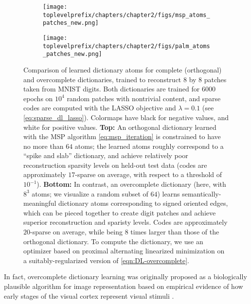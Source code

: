 \documentclass[\toplevelprefix/book-main.tex]{subfiles}
\begin{document}
\begin{figure}[t]
\centering
    \begin{subfigure}{0.9\linewidth}
        \centering
        \texttt{[image: \\toplevelprefix/chapters/chapter2/figs/msp\_atoms\_patches\_new.png]}
        \caption{}
    \end{subfigure}
    \begin{subfigure}{0.9\linewidth}
        \centering
        \texttt{[image: \\toplevelprefix/chapters/chapter2/figs/palm\_atoms\_patches\_new.png]}
        \caption{}
    \end{subfigure}
    \caption{Comparison of learned dictionary atoms for complete (orthogonal)
    and overcomplete dictionaries, trained to reconstruct $8$ by $8$ patches taken from
    MNIST digits. Both dictionaries are trained for $6000$ epochs on $10^4$ random patches with
    nontrivial content, and sparse codes are computed with the LASSO objective
    and $\lambda=0.1$ (see \eqref{eq:sparse_dl_lasso}). Colormaps have black for negative values, and white for
    positive values. \textbf{Top:} An orthogonal dictionary learned with the
    MSP algorithm \eqref{eq:msp_iteration} is constrained to
    have no more than $64$ atoms; the learned atoms roughly correspond to
    a ``spike and slab'' dictionary, and achieve relatively poor reconstruction sparsity
    levels on held-out test data (codes are approximately $17$-sparse on
    average, with respect to a threshold of $10^{-1}$).
    \textbf{Bottom:} In contrast, an overcomplete dictionary (here, with $8^3$
    atoms; we visualize a random subset of $64$) learns
    semantically-meaningful dictionary atoms corresponding to signed oriented
    edges, which can be pieced together to create digit patches and achieve
    superior reconstruction and sparisty levels. Codes are approximately
    $20$-sparse on
    average, while being $8$ times larger than those of the orthogonal
    dictionary. To compute the
    dictionary, we use an optimizer based on proximal alternating linearized
    minimization on a suitably-regularized version of
    \eqref{eqn:DL-overcomplete}.}
    \label{fig:ReconMNIST}
\end{figure}

In fact, overcomplete dictionary learning was originally proposed as a biologically plausible algorithm for image representation based on empirical evidence of how early stages of the visual cortex represent visual stimuli \cite{Olshausen1996-ap,Olshausen1997-yv}. 
\end{document}
